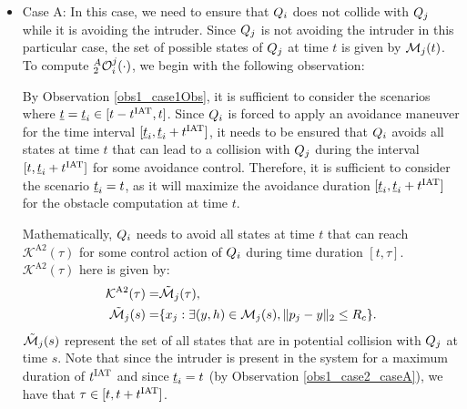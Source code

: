 \begin{itemize}[leftmargin=*] 
\item \label{sec:intruderObs_case2_caseA} Case A: In this case, we need to ensure that $Q_i$ does not collide with $Q_j$ while it is avoiding the intruder. Since $Q_j$ is not avoiding the intruder in this particular case, the set of possible states of $Q_j$ at time $t$ is given by $\mathcal{M}_j(t)$. To compute $_2^A\mathcal{O}_i^j(\cdot)$, we begin with the following observation: 
\begin{observation} \label{obs1_case2_caseA}
By Observation \ref{obs1_case1Obs}, it is sufficient to consider the scenarios where $\underline{t} = \underline{t}_i \in [t-t^\text{IAT}, t]$. Since $Q_i$ is forced to apply an avoidance maneuver for the time interval $[\underline{t}_i, \underline{t}_i+t^\text{IAT}]$, it needs to be ensured that $Q_i$ avoids all states at time $t$ that can lead to a collision with $Q_j$ during the interval $[t, \underline{t}_i+t^\text{IAT}]$ for some avoidance control. Therefore, it is sufficient to consider the scenario $\underline{t}_i = t$, as it will maximize the avoidance duration $[\underline{t}_i, \underline{t}_i+t^\text{IAT}]$ for the obstacle computation at time $t$.  
\end{observation}

Mathematically, $Q_i$ needs to avoid all states at time $t$ that can reach $\mathcal{K}^{\text{A2}}(\tau)$ for some control action of $Q_i$ during time duration $[t, \tau]$. $\mathcal{K}^{\text{A2}}(\tau)$ here is given by:
\begin{equation}
\begin{aligned}
\mathcal{K}^{\text{A2}}(\tau) = & \tilde{\mathcal{M}}_j(\tau),\\
\tilde{\mathcal{M}}_j(s) = & \{x_j: \exists (y, h) \in \mathcal{M}_j(s), \|p_j - y\|_2 \le R_c \}.
\end{aligned}
\end{equation}
$\tilde{\mathcal{M}}_j(s)$ represent the set of all states that are in potential collision with $Q_j$ at time $s$. Note that since the intruder is present in the system for a maximum duration of $t^\text{IAT}$ and since $\underline{t}_i = t$ (by Observation \ref{obs1_case2_caseA}), we have that $\tau \in [t, t+t^\text{IAT}]$. 


\end{itemize}
